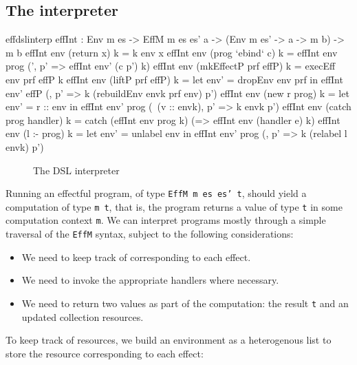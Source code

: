 \subsection{The \Eff{} interpreter}

\begin{SaveVerbatim}{effdslinterp}
effInt : Env m es -> EffM m es es' a -> (Env m es' -> a -> m b) -> m b
effInt env (return x) k = k env x
effInt env (prog `ebind` c) k = effInt env prog (\env', p' => effInt env' (c p') k)
effInt env (mkEffectP prf effP) k = execEff env prf effP k
effInt env (liftP prf effP) k = let env' = dropEnv env prf in 
                                    effInt env' effP (\envk, p' => k (rebuildEnv envk prf env) p')
effInt env (new r prog) k = let env' = r :: env in 
                                effInt env' prog (\ (v :: envk), p' => k envk p')
effInt env (catch prog handler) k = catch (effInt env prog k)
                                          (\e => effInt env (handler e) k)
effInt env (l :- prog) k = let env' = unlabel env in
                                      effInt env' prog (\envk, p' => k (relabel l envk) p')
\end{SaveVerbatim}

\begin{figure*}[t]
\begin{center}
\end{center}
\caption{The \Eff{} DSL interpreter}
\label{effdslimp}
\end{figure*}

Running an effectful program, of type \texttt{EffM m es es' t}, should yield
a computation of type \texttt{m t}, that is, the program returns a value of type
\texttt{t} in some computation context \texttt{m}. We can interpret programs
mostly through a simple traversal of the \texttt{EffM} syntax, subject to the
following considerations:

\begin{itemize}
\item We need to keep track of  corresponding to each effect.
\item We need to invoke the appropriate handlers where necessary.
\item We need to return two values as part of the computation: the result
\texttt{t} and an updated collection resources.
\end{itemize}

\noindent
To keep track of resources, we build an environment as a heterogenous list to
store the resource corresponding to each effect:

